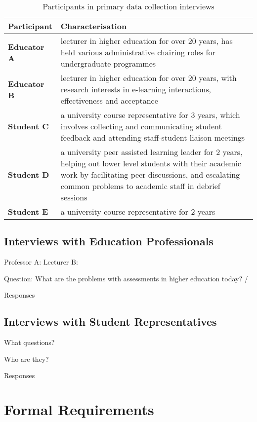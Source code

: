 \begin{table}[!h] 
    \caption{Participants in primary data collection interviews}
    \centering
    \label{table:participants-req}
    \begin{tabularx}{\textwidth}{>{\bfseries}lX}
        Participant & Characterisation\\
        \toprule
        Educator A & lecturer in higher education for over 20 years, has held various administrative 
        chairing roles for undergraduate programmes\\\midrule
        Educator B & lecturer in higher education for over 20 years, with research interests 
        in e-learning interactions, effectiveness and acceptance\\\midrule
        Student C & a university course representative for 3 years, which involves collecting and 
        communicating student feedback and attending staff-student liaison meetings \\\midrule
        Student D & a university peer assisted learning leader for 2 years, helping out lower level 
        students with their academic work by facilitating peer discussions, and escalating common problems
        to academic staff in debrief sessions\\\midrule
        Student E & a university course representative for 2 years\\\bottomrule
    \end{tabularx}
\end{table}

\subsection{Interviews with Education Professionals}

Professor A:
Lecturer B:

Question: What are the problems with assessments in higher education today? / 

Responses

\subsection{Interviews with Student Representatives}


What questions?

Who are they?

Responses

\section{Formal Requirements}